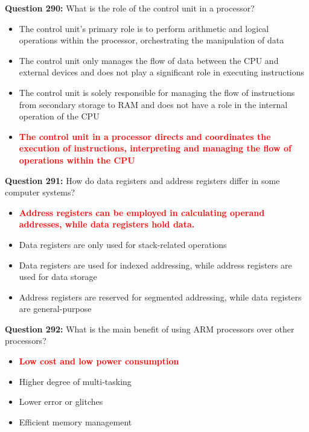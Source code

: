 \documentclass[12pt,a4paper]{article}
\begin{document}
\vspace{0.5cm}

\textbf{Question 290:} What is the role of the control unit in a processor?

\begin{itemize}
    \item[\textbf{A.}] The control unit's primary role is to perform arithmetic and logical operations within the processor, orchestrating the manipulation of data
    \item[\textbf{B.}] The control unit only manages the flow of data between the CPU and external devices and does not play a significant role in executing instructions
    \item[\textbf{C.}] The control unit is solely responsible for managing the flow of instructions from secondary storage to RAM and does not have a role in the internal operation of the CPU
    \item[\textbf{D.}] \textcolor{red}{\textbf{The control unit in a processor directs and coordinates the execution of instructions, interpreting and managing the flow of operations within the CPU}}
\end{itemize}

\vspace{0.5cm}

\textbf{Question 291:} How do data registers and address registers differ in some computer systems?

\begin{itemize}
    \item[\textbf{A.}] \textcolor{red}{\textbf{Address registers can be employed in calculating operand addresses, while data registers hold data.}}
    \item[\textbf{B.}] Data registers are only used for stack-related operations
    \item[\textbf{C.}] Data registers are used for indexed addressing, while address registers are used for data storage
    \item[\textbf{D.}] Address registers are reserved for segmented addressing, while data registers are general-purpose
\end{itemize}

\vspace{0.5cm}

\textbf{Question 292:} What is the main benefit of using ARM processors over other processors?

\begin{itemize}
    \item[\textbf{A.}] \textcolor{red}{\textbf{Low cost and low power consumption}}
    \item[\textbf{B.}] Higher degree of multi-tasking
    \item[\textbf{C.}] Lower error or glitches
    \item[\textbf{D.}] Efficient memory management
\end{itemize}
\end{document}
